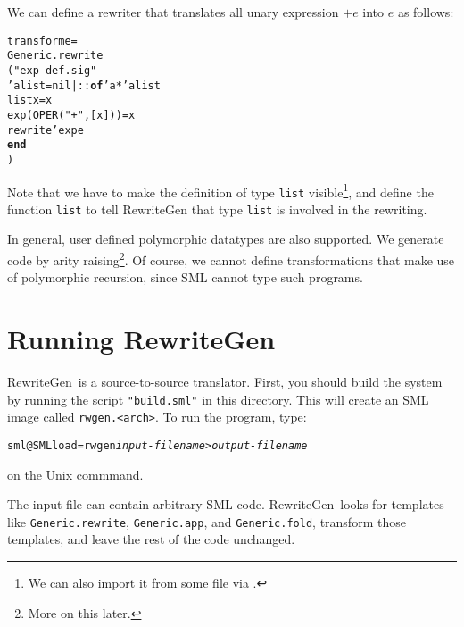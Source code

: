 \documentclass{article}
\newcommand{\RewriteGen}{{\sf RewriteGen}}
\newcommand{\END}{{\bf end}}
\newcommand{\OF}{{\bf of}}
\begin{document}
We can define a rewriter that translates all unary expression $+e$ 
into $e$ as follows:
\begin{alltt}
   \FUN transform e =
   Generic.rewrite
   ( \LET \INCLUDE "exp-def.sig"
          \DATATYPE 'a list = nil | :: \OF 'a * 'a list 
          \FUN list x = x
          \FUN exp (OPER("+",[x])) = x
     \IN  rewrite'exp e
     \END
   )
\end{alltt}
 Note that we have to make the definition of
type \verb|list| visible\footnote{We can also import it from some file
via \INCLUDE.}, and define the function \verb|list| to tell \RewriteGen{}
that type \verb|list| is involved in the rewriting. 

 In general, user defined polymorphic datatypes are also supported.
We generate code by arity raising\footnote{More on this later.}.
 Of course, we cannot define transformations that make use of 
polymorphic recursion, since SML cannot type such programs.

\section{Running \RewriteGen}

  \RewriteGen\ is a source-to-source translator.  First, you should
build the system by running the script \verb|"build.sml"| in this
directory.  This will create an SML image called \verb|rwgen.<arch>|.
To run the program, type:
\begin{alltt}
    sml @SMLload=rwgen {\em input-filename} > {\em output-filename}
\end{alltt}
\noindent on the Unix commmand.

The input file can contain arbitrary SML code.  \RewriteGen\ looks
for templates like \verb|Generic.rewrite|, \verb|Generic.app|,
and \verb|Generic.fold|, transform those templates, and
leave the rest of the code unchanged.
\end{document}
